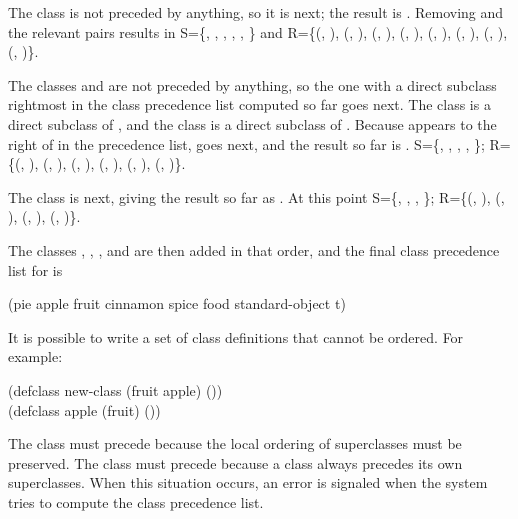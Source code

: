 \begin{flushleft}
The class  is not preceded by anything, so it is next; the
result is . Removing  and the relevant
pairs results in S=\{,
,
,
,
,
\} and R=\{(,
),
(,
),
(,
),
(,
),
(,
),
(,
),
(,
),
(,
)\}.

The classes  and  are not preceded by
anything, so the one with a direct subclass rightmost in the class
precedence list computed so far goes next.  The class  is a
direct subclass of , and the class  is a direct
subclass of .  Because  appears to the right
of  in the precedence list,  goes next, and the
result so far is .  S=\{,
,
,
,
\}; R=\{(,
),
(,
),
(,
),
(,
),
(,
),
(,
)\}.

The class  is next, giving the result so far as 
.  At this point S=\{,
,
,
\}; R=\{(,
),
(,
),
(,
),
(,
)\}.
\end{flushleft}

The classes , , , and 
 are then added in that order, and the final class precedence list for  is
\begin{lisp}
(pie apple fruit cinnamon spice food standard-object t)
\end{lisp}

It is possible to write a set of class definitions that cannot be 
ordered.   For example: 

\begin{lisp}
(defclass new-class (fruit apple) ()) \\
(defclass apple (fruit) ())
\end{lisp}

The class  must precede  because the local
ordering of superclasses must be preserved.  The class  must
precede  because a class always precedes its own
superclasses.  When this situation occurs, an error is signaled when
the system tries to compute the class precedence list.


